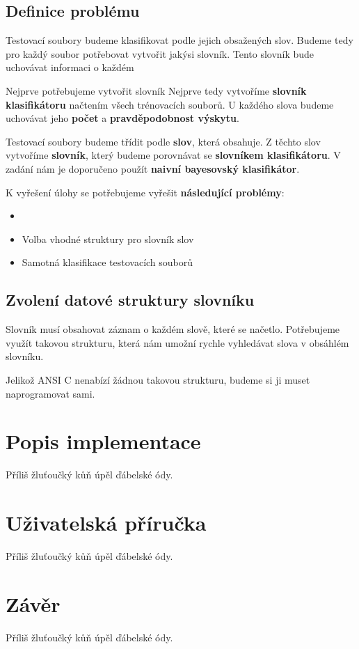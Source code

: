\documentclass[12pt]{report}
\begin{document}
	\section{Definice problému}
	Testovací soubory budeme klasifikovat podle jejich obsažených slov. Budeme tedy pro každý soubor potřebovat vytvořit jakýsi slovník. Tento slovník bude uchovávat informaci o každém 
	
	
	Nejprve potřebujeme vytvořit slovník 
	Nejprve tedy vytvoříme \textbf{slovník klasifikátoru} načtením všech trénovacích souborů. U každého slova budeme uchovávat jeho \textbf{počet} a \textbf{pravděpodobnost výskytu}. 
	
	Testovací soubory budeme třídit podle \textbf{slov}, která obsahuje. Z těchto slov vytvoříme \textbf{slovník}, který budeme porovnávat se \textbf{slovníkem klasifikátoru}. V zadání nám je doporučeno použít \textbf{naivní bayesovský klasifikátor}.
	
	K vyřešení úlohy se potřebujeme vyřešit \textbf{následující problémy}:
	\begin{itemize}
		\item 
		\item Volba vhodné struktury pro slovník slov
		\item Samotná klasifikace testovacích souborů
	\end{itemize}
	
	\section{Zvolení datové struktury slovníku}
	Slovník musí obsahovat záznam o každém slově, které se načetlo.
	Potřebujeme využít takovou strukturu, která nám umožní rychle vyhledávat slova v obsáhlém slovníku. 
	
	Jelikož ANSI C nenabízí žádnou takovou strukturu, budeme si ji muset naprogramovat sami.
	
	\chapter{Popis implementace}
	Příliš žluťoučký kůň úpěl ďábelské ódy.
	
	\chapter{Uživatelská příručka}
	Příliš žluťoučký kůň úpěl ďábelské ódy.
	
	\chapter{Závěr}
	Příliš žluťoučký kůň úpěl ďábelské ódy.
	
\end{document}
